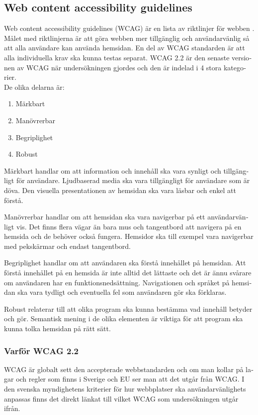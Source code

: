 \documentclass[11p]{article}
\begin{document}
\begin{otherlanguage}{swedish}
    \subsection{Web content accessibility guidelines}
    Web content accessibility guidelines (WCAG) är en lista av riktlinjer för webben \parencite{WCAG_2.2}.
    Målet med riktlinjerna är att göra webben mer tillgänglig och användarvänlig så att alla användare kan använda hemsidan.
    En del av WCAG standarden är att alla individuella krav ska kunna testas separat.
    WCAG 2.2 är den senaste versionen av WCAG när undersökningen gjordes och den är indelad i 4 stora kategorier.
    \\De olika delarna är:
    \begin{enumerate}
        \item Märkbart
        \item Manövrerbar
        \item Begriplighet
        \item Robust
    \end{enumerate}

    Märkbart handlar om att information och innehåll ska vara synligt och tillgängligt för användare.
    Ljudbaserad media ska vara tillgängligt för användare som är döva.
    Den visuella presentationen av hemsidan ska vara läsbar och enkel att förstå.

    Manövrerbar handlar om att hemsidan ska vara navigerbar på ett användarvänligt vis.
    Det finns flera vägar än bara mus och tangentbord att navigera på en hemsida och de behöver också fungera.
    Hemsidor ska till exempel vara navigerbar med pekskärmar och endast tangentbord.

    Begriplighet handlar om att användaren ska förstå innehållet på hemsidan.
    Att förstå innehållet på en hemsida är inte alltid det lättaste och det är ännu svårare om användaren har en funktionsnedsättning.
    Navigationen och språket på hemsidan ska vara tydligt och eventuella fel som användaren gör ska förklaras.

    Robust relaterar till att olika program ska kunna bestämma vad innehåll betyder och gör.
    Semantisk mening i de olika elementen är viktiga för att program ska kunna tolka hemsidan på rätt sätt.

    \subsubsection{Varför WCAG 2.2}
    WCAG är globalt sett den accepterade webbstandarden och om man kollar på lagar och regler som finns i Sverige och EU ser man att det utgår från WCAG.
    I den svenska myndighetens kriterier för hur webbplatser ska användarvänlighets anpassas finns det direkt länkat till vilket WCAG som undersökningen utgår ifrån. \parencite{Utförande_av_Dos_lagen}



\end{otherlanguage}
\end{document}
